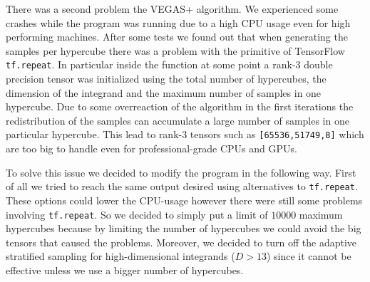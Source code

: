 \documentclass[../main/main.tex]{subfiles}
\begin{document}
There was a second problem the VEGAS+ algorithm.
We experienced some crashes while the program was running due to a high CPU usage even for high performing machines. After some tests we found out that when generating the samples per hypercube there was a problem with the primitive of TensorFlow \texttt{tf.repeat}. In particular inside the function at some point a rank-3 double precision tensor was initialized using the total number of hypercubes, the dimension of the integrand and the maximum number of samples in one hypercube. Due to some overreaction of the algorithm in the first iterations the redistribution of the samples can accumulate a large number of samples in one particular hypercube. This lead to rank-3 tensors such as \texttt{[65536,51749,8]} which are too big to handle even for professional-grade CPUs and GPUs.

To solve this issue we decided to modify the program in the following way.
First of all we tried to reach the same output desired using alternatives to \texttt{tf.repeat}. These options could lower the CPU-usage however there were still some problems involving \texttt{tf.repeat}. So we decided to simply put a limit of $10000$ maximum hypercubes because by limiting the number of hypercubes we could avoid the big tensors that caused the problems.
Moreover,  we decided to turn off the adaptive stratified sampling for high-dimensional integrands ($D > 13$) since it cannot be effective unless we use a bigger number of hypercubes.
\end{document}
